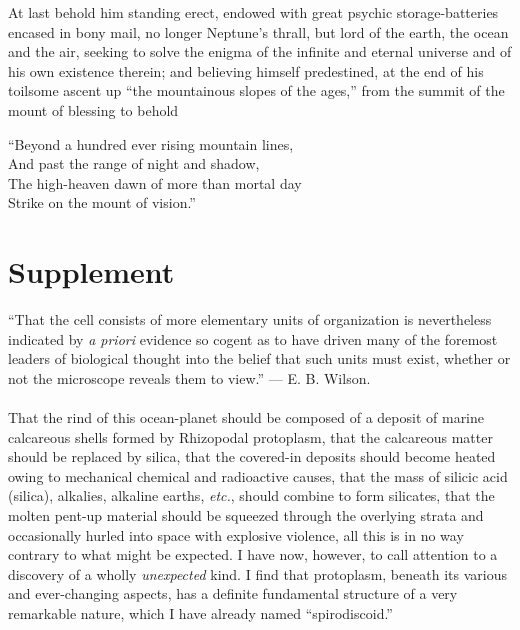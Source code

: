 \documentclass[a4paper, 12pt, oneside, landscape]{article}
\begin{document}
At last behold him standing erect, endowed with great psychic storage-batteries encased in bony mail, no longer Neptune's thrall, but lord of the earth, the ocean and the air, seeking to solve the enigma of the infinite and eternal universe and of his own existence therein; and believing himself predestined, at the end of his toilsome ascent up ``the mountainous slopes of the ages,'' from the summit of the mount of blessing to behold
\begin{displayquote}
``Beyond a hundred ever rising mountain lines,\\And past the range of night and shadow,\\The high-heaven dawn of more than mortal day\\Strike on the mount of vision.''
\end{displayquote}
\clearpage
\section{Supplement}
\begin{displayquote}
``That the cell consists of more elementary units of organization is nevertheless indicated by \emph{a priori} evidence so cogent as to have driven many of the foremost leaders of biological thought into the belief that such units must exist, whether or not the microscope reveals them to view.'' --- E. B. Wilson.
\end{displayquote}
\paragraph{}
That the rind of this ocean-planet should be composed of a deposit of marine calcareous shells formed by Rhizopodal protoplasm, that the calcareous matter should be replaced by silica, that the covered-in deposits should become heated owing to mechanical chemical and radioactive causes, that the mass of silicic acid (silica), alkalies, alkaline earths, \emph{etc.}, should combine to form silicates, that the molten pent-up material should be squeezed through the overlying strata and occasionally hurled into space with explosive violence, all this is in no way contrary to what might be expected. I have now, however, to call attention to a discovery of a wholly \emph{unexpected} kind. I find that protoplasm, beneath its various and ever-changing aspects, has a definite fundamental structure of a very remarkable nature, which I have already named ``spirodiscoid.''
\end{document}
